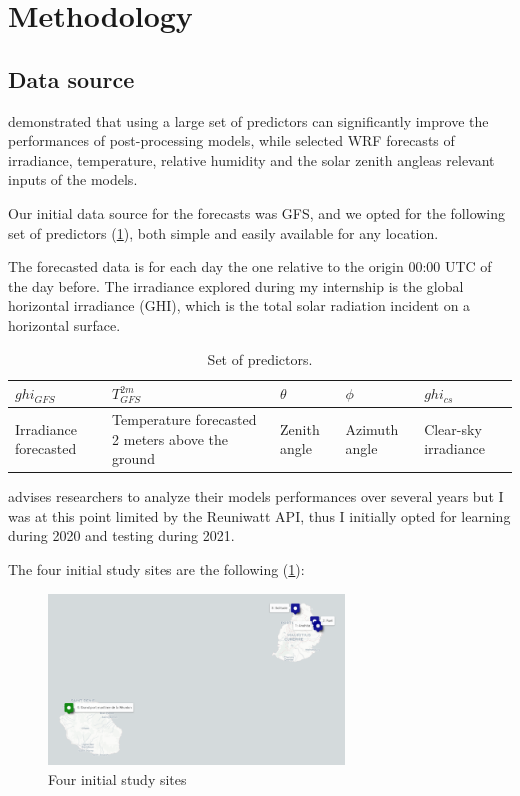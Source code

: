 \section{Methodology}
\label{sec:methodo}
\subsection{Data source}
\cite{verbois_statistical_2022} demonstrated that using a large set of predictors can significantly improve the performances of post-processing models, while \cite{suksamosorn_post-processing_2021}
selected WRF forecasts of irradiance, temperature, relative humidity and the solar zenith angleas relevant inputs of the models.

Our initial data source for the forecasts was GFS, and we opted for the following set of predictors (\ref{tab:set_pred}), both simple and easily available for any location.

The forecasted data is for each day the one relative to the origin 00:00 UTC of the day before. The irradiance explored during my internship is the global horizontal irradiance (GHI), which is
the total solar radiation incident on a horizontal surface.

\begin{table}[h]
    \centering
    \begin{tabularx}{\textwidth} { 
  | >{\centering\arraybackslash}X 
  | >{\centering\arraybackslash}X 
  | >{\centering\arraybackslash}X 
  | >{\centering\arraybackslash}X
  | >{\centering\arraybackslash}X 
  |}
 \hline
 $ghi_{GFS}$ & $T_{GFS}^{2m}$ & $\theta$ & $\phi$ & $ghi_{cs}$ \\
 \hline
 \scriptsize Irradiance forecasted  & \scriptsize Temperature forecasted 2 meters above the ground & \scriptsize Zenith angle & \scriptsize Azimuth angle & \scriptsize Clear-sky irradiance \\
\hline
\end{tabularx}
    \caption{Set of predictors.}
    \label{tab:set_pred}
\end{table}

\cite{verbois_statistical_2022} advises researchers to analyze their models performances over several years but I was at this point limited by the Reuniwatt API, thus
I initially opted for learning during 2020 and testing during 2021.

The four initial study sites are the following (\ref{fig:initial_sites}):
\begin{figure}[htb!]
    \centering
    \includegraphics[width=0.7\textwidth]{figures/initial_study_sites.png}
    \caption{Four initial study sites}
    \label{fig:initial_sites}
\end{figure}
